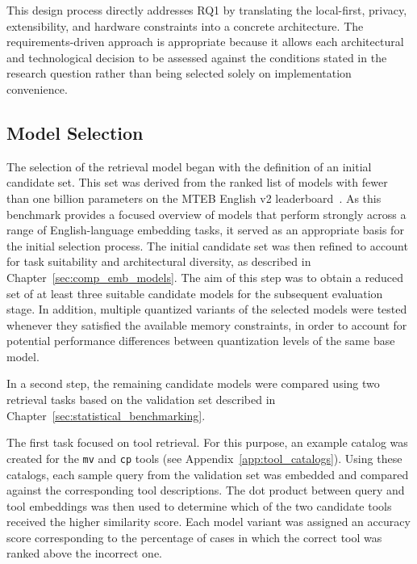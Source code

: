 This design process directly addresses RQ1 by translating the local-first, privacy, extensibility, and hardware constraints into a concrete architecture. The requirements-driven approach is appropriate because it allows each architectural and technological decision to be assessed against the conditions stated in the research question rather than being selected solely on implementation convenience.

\subsection{Model Selection}\label{sec:model_selection_meth}

The selection of the retrieval model began with the definition of an initial candidate set. This set was derived from the ranked list of models with fewer than one billion parameters on the MTEB English v2 leaderboard~\cite{mteb_leaderboard,enevoldsen2025mmteb}. As this benchmark provides a focused overview of models that perform strongly across a range of English-language embedding tasks, it served as an appropriate basis for the initial selection process. The initial candidate set was then refined to account for task suitability and architectural diversity, as described in Chapter~\ref{sec:comp_emb_models}. The aim of this step was to obtain a reduced set of at least three suitable candidate models for the subsequent evaluation stage. In addition, multiple quantized variants of the selected models were tested whenever they satisfied the available memory constraints, in order to account for potential performance differences between quantization levels of the same base model.

In a second step, the remaining candidate models were compared using two retrieval tasks based on the validation set described in Chapter~\ref{sec:statistical_benchmarking}.

The first task focused on tool retrieval. For this purpose, an example catalog was created for the \texttt{mv} and \texttt{cp} tools (see Appendix~\ref{app:tool_catalogs}). Using these catalogs, each sample query from the validation set was embedded and compared against the corresponding tool descriptions. The dot product between query and tool embeddings was then used to determine which of the two candidate tools received the higher similarity score. Each model variant was assigned an accuracy score corresponding to the percentage of cases in which the correct tool was ranked above the incorrect one.

